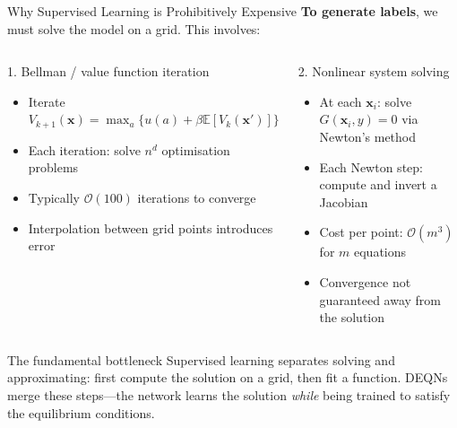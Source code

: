 \documentclass[aspectratio=169,11pt]{beamer}
\newcommand{\emphc}[1]{\textcolor{harvardcrimson}{#1}}
\newcommand{\x}{\bm{x}}
\newcommand{\E}[1]{\mathbb{E}\!\left[#1\right]}
\begin{document}
\begin{frame}{Why Supervised Learning is Prohibitively Expensive}
\textbf{To generate labels}, we must solve the model on a grid. This involves:

\vspace{0.3em}
\begin{columns}[T]
\begin{alertblock}{1. Bellman / value function iteration}
\begin{itemize}
    \item Iterate $V_{k+1}(\x) = \max_a \{u(a) + \beta \E{V_k(\x')}\}$
    \item Each iteration: solve $n^d$ optimisation problems
    \item Typically $\mathcal{O}(100)$ iterations to converge
    \item Interpolation between grid points introduces error
\end{itemize}
\end{alertblock}

\begin{alertblock}{2. Nonlinear system solving}
\begin{itemize}
    \item At each $\x_i$: solve $G(\x_i, y) = 0$ via Newton's method
    \item Each Newton step: compute and invert a Jacobian
    \item Cost per point: $\mathcal{O}(m^3)$ for $m$ equations
    \item Convergence not guaranteed away from the solution
\end{itemize}
\end{alertblock}
\end{columns}

\vspace{0.5em}
\begin{block}{The fundamental bottleneck}
Supervised learning \emphc{separates} solving and approximating: first compute
the solution on a grid, then fit a function.  DEQNs \emphc{merge} these steps---the
network learns the solution \emph{while} being trained to satisfy the equilibrium conditions.
\end{block}
\end{frame}
\end{document}
